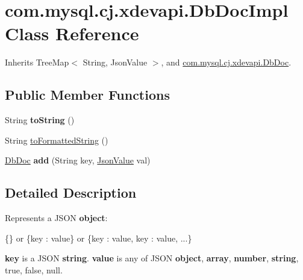 \hypertarget{classcom_1_1mysql_1_1cj_1_1xdevapi_1_1_db_doc_impl}{}\section{com.\+mysql.\+cj.\+xdevapi.\+Db\+Doc\+Impl Class Reference}
\label{classcom_1_1mysql_1_1cj_1_1xdevapi_1_1_db_doc_impl}


Inherits Tree\+Map$<$ String, Json\+Value $>$, and \mbox{\hyperlink{interfacecom_1_1mysql_1_1cj_1_1xdevapi_1_1_db_doc}{com.\+mysql.\+cj.\+xdevapi.\+Db\+Doc}}.

\subsection*{Public Member Functions}
\begin{DoxyCompactItemize}
\item 
\mbox{\label{classcom_1_1mysql_1_1cj_1_1xdevapi_1_1_db_doc_impl_abcc9b6b3b3d9cbd802d4a4e141e26c22}} 
String {\bfseries to\+String} ()
\item 
String \mbox{\hyperlink{classcom_1_1mysql_1_1cj_1_1xdevapi_1_1_db_doc_impl_a4880b999d135b6a871d605b523fc1529}{to\+Formatted\+String}} ()
\item 
\mbox{\label{classcom_1_1mysql_1_1cj_1_1xdevapi_1_1_db_doc_impl_afc266a49bb4249ce1a52ce6e69c7daea}} 
\mbox{\hyperlink{interfacecom_1_1mysql_1_1cj_1_1xdevapi_1_1_db_doc}{Db\+Doc}} {\bfseries add} (String key, \mbox{\hyperlink{interfacecom_1_1mysql_1_1cj_1_1xdevapi_1_1_json_value}{Json\+Value}} val)
\end{DoxyCompactItemize}


\subsection{Detailed Description}
Represents a J\+S\+ON {\bfseries object}\+:


\begin{DoxyPre}
  \{\}
  or
  \{key : value\}
  or
  \{key : value, key : value, ...\}
\end{DoxyPre}


{\bfseries key} is a J\+S\+ON {\bfseries string}. {\bfseries value} is any of J\+S\+ON {\bfseries object}, {\bfseries array}, {\bfseries number}, {\bfseries string}, true, false, null.

